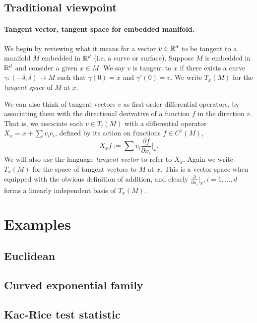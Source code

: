 \documentclass{article}
\begin{document}
	
	\subsection{Traditional viewpoint}
	\label{subsec:traditional-viewpoint}
	\paragraph{Tangent vector, tangent space for embedded manifold.}
	We begin by reviewing what it means for a vector $v \in \mathbb{R}^d$ to be tangent to a manifold $M$ embedded in $\mathbb{R}^d$ (i.e. a curve or surface). Suppose $M$ is embedded in $\mathbb{R}^d$ and consider a given $x \in M$. We say $v$ is tangent to $x$ if there exists a curve $\gamma: (-\delta,\delta) \to M$ such that $\gamma(0) = x$ and $\gamma'(0) = v$. We write $T_x(M)$ for the \emph{tangent space} of $M$ at $x$.
	
	We can also think of tangent vectors $v$ as first-order differential operators, by associating them with the directional derivative of a function $f$ in the direction $v$. That is, we associate each $v \in T_t(M)$ with a differential operator $X_x = x + \sum v_i e_i$, defined by its action on functions $f \in C^1(M)$,
	\begin{equation*}
		X_xf := \sum v_i \frac{\partial f}{\partial x_i} \Big|_{x}.
	\end{equation*}
	We will also use the language \emph{tangent vector} to refer to $X_x$. Again we write $T_x(M)$ for the space of tangent vectors to $M$ at $x$. This is a vector space when equipped with the obvious definition of addition, and clearly $\frac{\partial}{\partial x_i}|_x, i = 1,\ldots,d$ forms a linearly independent basis of $T_x(M)$. 
	
	\section{Examples}
	
	\subsection{Euclidean}
	
	\subsection{Curved exponential family}
	
	\subsection{Kac-Rice test statistic}
	
\end{document}
